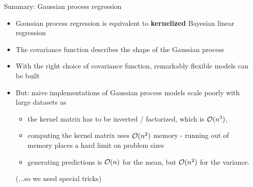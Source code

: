 \begin{vbframe}{Summary: Gaussian process regression}

\begin{itemize}
\item Gaussian process regression is equivalent to \textbf{kernelized} Bayesian linear regression
\item The covariance function describes the shape of the Gaussian process
\item With the right choice of covariance function, remarkably flexible models can be built
\item But: naive implementations of Gaussian process models scale poorly with large datasets as
\begin{itemize}
\item the kernel matrix has to be inverted / factorized, which is $\mathcal{O}(n^3)$,
\item computing the kernel matrix uses $\mathcal{O}(n^2)$ memory - running out of memory places a hard limit on problem sizes
\item generating predictions is $\mathcal{O}(n)$ for the mean, but $\mathcal{O}(n^2)$ for the variance.
\end{itemize}
(...so we need special tricks)
\end{itemize}

\end{vbframe}


\endlecture


